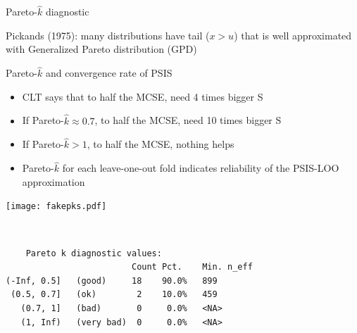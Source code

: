 \documentclass[english,t]{beamer}
\begin{document}
\begin{frame}{Pareto-$\hat{k}$ diagnostic}

   Pickands (1975): many distributions have tail ($x > u$) that
    is well approximated with Generalized Pareto distribution (GPD)

    {
      \vspace{-0.5\baselineskip}
}

\end{frame}

\begin{frame}{Pareto-$\hat{k}$ and convergence rate of PSIS}

  \begin{itemize}
  \item CLT says that to half the MCSE, need 4 times bigger S
  \item<2-> If Pareto-$\hat{k} \approx 0.7$, to half the MCSE, need 10 times bigger S
  \item<3-> If Pareto-$\hat{k}>1$, to half the MCSE, nothing helps
  \end{itemize}
  
\end{frame}

\begin{frame}[fragile]

  \begin{itemize}
  \item Pareto-$\hat{k}$ for each leave-one-out fold indicates
    reliability of the PSIS-LOO approximation
  \end{itemize}
  \texttt{[image: fakepks.pdf]}

\end{frame}

\begin{frame}[fragile]

  \\
  {\scriptsize
\begin{lstlisting}
    Pareto k diagnostic values:
                         Count Pct.    Min. n_eff
(-Inf, 0.5]   (good)     18    90.0%   899       
 (0.5, 0.7]   (ok)        2    10.0%   459       
   (0.7, 1]   (bad)       0     0.0%   <NA>      
   (1, Inf)   (very bad)  0     0.0%   <NA>      
\end{lstlisting}
}

\end{frame}
\end{document}
